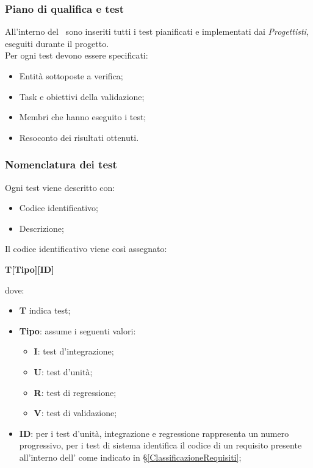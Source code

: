 \subsubsection{Piano di qualifica e test}
All'interno del \PdQ\ sono inseriti tutti i test pianificati e implementati dai \textit{Progettisti}, eseguiti durante il progetto.\\
Per ogni test devono essere specificati:
\begin{itemize}
	\item Entità sottoposte a verifica;
	\item Task e obiettivi della validazione;
	\item Membri che hanno eseguito i test;
	\item Resoconto dei risultati ottenuti.
\end{itemize}

\subsubsection{Nomenclatura dei test}
Ogni test viene descritto con:
\begin{itemize}
	\item Codice identificativo;
	\item Descrizione;
\end{itemize}
Il codice identificativo viene così assegnato:
\begin{center}
	\textbf{T[Tipo][ID]}
\end{center}
dove:
\begin{itemize}
	\item \textbf{T} indica test;
	\item\textbf{Tipo}: assume i seguenti valori:
	\begin{itemize}
		\item \textbf{I}: test d'integrazione;
		\item \textbf{U}: test d'unità;
		\item \textbf{R}: test di regressione;
		\item \textbf{V}: test di validazione;
	\end{itemize}
	\item \textbf{ID}: per i test d'unità, integrazione e regressione rappresenta un numero progressivo, per i test di sistema identifica il codice di un requisito presente all'interno dell'\AdRv{} come indicato in \S\ref{ClassificazioneRequisiti};
\end{itemize}